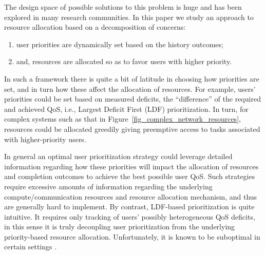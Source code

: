 \documentclass[prodmode,acmtompecs]{acmsmall}
\newcommand{\myComments}[1]{}
\newif\ifinfocom
\newif\ifextended
\newcommand{\infocomStart}{\ifinfocom \myComments{Infocom: }}
\newcommand{\extendedStart}{\ifextended  \myComments{Extended version: }}
\newcommand{\commentEnd}{\myComments{End}}
\begin{document}
\infocomStart
\begin{figure}[htp]
  \centering
  \texttt{[image: Figures/example\_complex\_network\_resources.pdf]}
  \caption{An example for a network of resources. A, B, C and D represent compute/communication resources. }
  \label{fig_complex_network_resources}
\end{figure}
\commentEnd\fi

\extendedStart
\begin{figure}[htp]
  \centering
  \texttt{[image: Figures/example\_complex\_network\_resources.pdf]}
  \caption{An example for a network of resources. A, B, C and D represent compute/communication resources. Tasks from User 1 need to be processed on A, B, C, D while tasks from User 2 require processing on B, C. }
  \label{fig_complex_network_resources}
\end{figure}
\commentEnd\fi



The design space of possible solutions to this problem is huge and has been
explored in many research communities. In this paper we study an approach to
resource allocation based on a decomposition of concerns:
\begin{enumerate}
\item user priorities are dynamically set based on the history outcomes; 
\item and, resources are allocated so as to favor users with higher priority.
\end{enumerate}
In such a framework there is quite a bit of latitude in choosing how priorities are set, and
in turn how these affect the allocation of resources. 
For example, users' priorities could be set based on measured deficits, the ``difference'' of the required and achieved QoS, 
i.e., Largest Deficit First (LDF) prioritization. 
In turn, for complex systems such as that in Figure~{\ref{fig_complex_network_resources}}, resources
could be allocated greedily giving preemptive access to tasks associated with higher-priority users.

In general an optimal user prioritization strategy could leverage detailed
information regarding how these priorities will impact the allocation of resources and completion outcomes to achieve
the best possible user QoS. 
Such strategies require excessive amounts of information regarding the underlying compute/communication resources and resource allocation mechanism, and thus are generally hard to implement. 
By contrast, LDF-based prioritization is quite intuitive. 
It requires only tracking of users' possibly heterogeneous QoS deficits, in this
sense it is truly decoupling user prioritization from the underlying priority-based resource allocation. 
Unfortunately, it is known to be suboptimal in certain settings \cite{DiW06,JLS07,KWJ13}.
\end{document}
